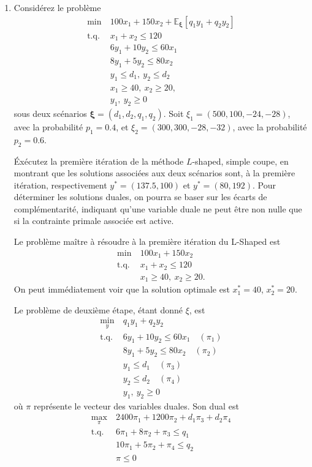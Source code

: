 \documentclass[12pt]{book}
\def\bxi {\boldsymbol{\xi}}
\def\EE {\mathbb{E}}
\begin{document}
\begin{enumerate}
\item
Considérez le problème
\begin{align*}
\min\ & 100x_1 + 150x_2 + \EE_{\bxi} [q_1y_1 + q_2y_2] \\
\mbox{t.q. }
& x_1 + x_2 \leq 120 \\
& 6y_1 + 10y_2 \leq 60x_1 \\
& 8y_1 + 5y_2 \leq 80x_2 \\
& y_1 \leq d_1,\ y_2 \leq d_2 \\
& x_1 \geq 40,\ x_2 \geq 20, \\
& y_1,\ y_2 \geq 0
\end{align*}
sous deux scénarios $\bxi = (d_1, d_2, q_1, q_2)$.
Soit $\xi_1 = (500, 100, -24, -28)$, avec la probabilité $p_1 = 0.4$, et $\xi_2 = (300, 300, -28, -32)$, avec la probabilité $p_2 = 0.6$.

Éxécutez la première itération de la méthode $L$-shaped, simple coupe, en montrant que les solutions associées aux deux scénarios sont, à la première itération, respectivement $y^* = (137.5, 100)$ et $y^* = (80, 192)$.
Pour déterminer les solutions duales, on pourra se baser sur les écarts de complémentarité, indiquant qu'une variable duale ne peut être non nulle que si la contrainte primale associée est active.

Le problème maître à résoudre à la première itération du L-Shaped est
\begin{align*}
\min\ & 100x_1 + 150x_2  \\
\mbox{t.q. }
& x_1 + x_2 \leq 120 \\
& x_1 \geq 40,\ x_2 \geq 20.
\end{align*}
On peut immédiatement voir que la solution optimale est $x_1^* = 40$, $x_2^* = 20$.

Le problème de deuxième étape, étant donné $\xi$, est
\begin{align*}
\min_y\ & q_1y_1 + q_2y_2 \\
\mbox{t.q. }
& 6y_1 + 10y_2 \leq 60x_1 \quad (\pi_1) \\
& 8y_1 + 5y_2 \leq 80x_2 \quad (\pi_2) \\
& y_1 \leq d_1  \quad (\pi_3) \\
& y_2 \leq d_2 \quad (\pi_4) \\
& y_1,\ y_2 \geq 0
\end{align*}
où $\pi$ représente le vecteur des variables duales.
Son dual est
\begin{align*}
\max_{\pi} \ &2400\pi_1 + 1200\pi_2 + d_1\pi_3 + d_2 \pi_4 \\
\mbox{t.q. }
& 6\pi_1 + 8\pi_2 +\pi_3 \leq q_1 \\
& 10\pi_1 + 5\pi_2+\pi_4 \leq q_2 \\
& \pi \leq 0
\end{align*}


\end{enumerate}
\end{document}
